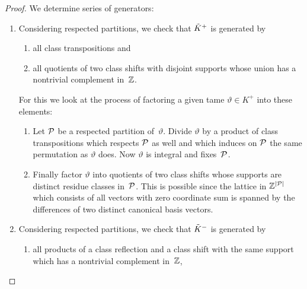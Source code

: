 \documentclass{amsart}
\theoremstyle{definition} \newtheorem{CTZDefinition}{Definition}[section]
\theoremstyle{plain}      \newtheorem{CTZPropertiesTheorem}[CTZDefinition]{Theorem}
\theoremstyle{plain}      \newtheorem{CTZSubgroupsTheorem}[CTZDefinition]{Theorem}
\theoremstyle{definition} \newtheorem{RcwaMappingDefinition}{Definition}[section]
\theoremstyle{definition} \newtheorem{RCWADefinition}[RcwaMappingDefinition]{Definition}
\theoremstyle{plain}      \newtheorem{CTZNotFinitelyGeneratedTheorem}
\theoremstyle{definition} \newtheorem{CTZSmEmbeddingDefinition}[RcwaMappingDefinition]{Definition}
\theoremstyle{plain}      \newtheorem{CTZHighlyTransitiveTheorem}[RcwaMappingDefinition]{Theorem}
\theoremstyle{plain}      \newtheorem{CTZTorsionElementsDivisibleTheorem}
\theoremstyle{plain}      \newtheorem{CTLemma}{Lemma}[section]
\theoremstyle{plain}      \newtheorem{IntegralCommutatorLemma}[CTLemma]{Lemma}
\theoremstyle{plain}      \newtheorem{NormalSubgroupContainsIntegralElementLemma}[CTLemma]{Lemma}
\theoremstyle{plain}      \newtheorem{CTZSimpleTheorem}[CTLemma]{Theorem}
\theoremstyle{remark}     \newtheorem{CTZSimpleRemark}[CTLemma]{Remark}
\theoremstyle{definition} \newtheorem{CTPZDefinition}[CTLemma]{Definition}
\theoremstyle{plain}      \newtheorem{CTPZSimpleCorollary}[CTLemma]{Corollary}
\theoremstyle{plain}      \newtheorem{CTPZSimpleProblem}[CTLemma]{Problem}
\theoremstyle{plain}      \newtheorem{FnPSL2ZEmbeddingTheorem}{Theorem}[section]
\theoremstyle{plain}      \newtheorem{FreeProductEmbeddingTheorem}[FnPSL2ZEmbeddingTheorem]{Theorem}
\theoremstyle{definition} \newtheorem{RestrictionMonomorphismDefinition}
\theoremstyle{plain}      \newtheorem{DirectAndWreathProductsEmbeddingTheorem}
\theoremstyle{plain}      \newtheorem{DirectAndWreathProductsEmbeddingCorollary}
\theoremstyle{definition} \newtheorem{CTintZDefinition}[FnPSL2ZEmbeddingTheorem]{Definition}
\theoremstyle{plain}      \newtheorem{CTintZSimpleTheorem}[FnPSL2ZEmbeddingTheorem]{Theorem}
\theoremstyle{definition} \newtheorem{KernelDefinition}{Definition}[section]
\theoremstyle{definition} \newtheorem{TameWildDefinition}[KernelDefinition]{Definition}
\theoremstyle{definition} \newtheorem{SimpleSupergroupsDefinition}[KernelDefinition]{Definition}
\theoremstyle{definition} \newtheorem{CSCRDefinition}[KernelDefinition]{Definition}
\theoremstyle{plain}      \newtheorem{SimpleSupergroupsGeneratorsTheorem}[KernelDefinition]{Theorem}
\theoremstyle{plain}      \newtheorem{SimpleSupergroupsTheorem}[KernelDefinition]{Theorem}
\theoremstyle{plain}      \newtheorem{SimpleSupergroupsTransitivityTheorem}
\theoremstyle{plain}      \newtheorem{TameGenerationConjecture}[KernelDefinition]{Conjecture}
\theoremstyle{remark}     \newtheorem{TameGenerationRemark}[KernelDefinition]{Remark}
\begin{document}
\begin{proof}
  We determine series of generators:
  \begin{enumerate}

    \item Considering respected partitions, we check that \(\tilde{K}^+\) is generated by
          \begin{enumerate}

            \item all class transpositions and

            \item all quotients of two class shifts with disjoint supports whose union has
                  a nontrivial complement in~\(\mathbb{Z}\).

          \end{enumerate}
          For this we look at the process of factoring a given tame \(\vartheta \in K^+\)
          into these elements:
          \begin{enumerate}[{ad} (a)]

            \item Let \(\mathcal{P}\) be a respected partition of~\(\vartheta\).
                  Divide \(\vartheta\) by a product of class transpositions which respects \(\mathcal{P}\)
                  as well and which induces on \(\mathcal{P}\) the same permutation as \(\vartheta\) does.
                  Now \(\vartheta\) is integral and fixes~\(\mathcal{P}\).

            \item Finally factor \(\vartheta\) into quotients of two class shifts whose supports
                  are distinct residue classes in~\(\mathcal{P}\). This is possible since the lattice in
                  \(\mathbb{Z}^{|\mathcal{P}|}\) which consists of all vectors with zero coordinate sum is
                  spanned by the differences of two distinct canonical basis vectors.

          \end{enumerate}

    \goodbreak

    \item Considering respected partitions, we check that \(\tilde{K}^-\) is generated by
          \begin{enumerate}

            \item all products of a class reflection and a class shift with the same support which
                  has a nontrivial complement in~\(\mathbb{Z}\),


\end{enumerate}
\end{enumerate}
\end{proof}
\end{document}
